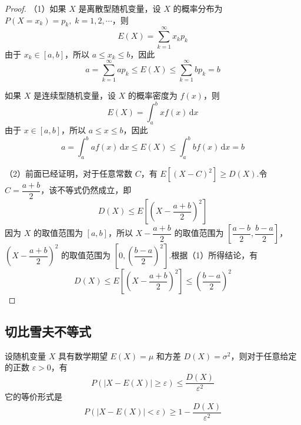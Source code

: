 \begin{proof}
    （1）如果 $X$ 是离散型随机变量，设 $X$ 的概率分布为 $P(X = x_k) = p_k, \; k=1,2,\cdots$，则
    $$
    E(X) = \sum_{k=1}^{\infty} x_k p_k
    $$
    由于 $x_k \in [a,b]$，所以 $a \leqslant x_k \leqslant b$，因此
    $$
    a = \sum_{k=1}^{\infty} a p_k \leqslant E(X) \leqslant \sum_{k=1}^{\infty} b p_k = b
    $$

    如果 $X$ 是连续型随机变量，设 $X$ 的概率密度为 $f(x)$，则
    $$
    E(X) = \int_{a}^{b} x f(x)\,\text{d}x
    $$
    由于 $x \in [a,b]$，所以 $a \leqslant x \leqslant b$，因此
    $$
    a = \int_{a}^{b} a f(x)\,\text{d}x \leqslant E(X) \leqslant \int_{a}^{b} b f(x)\,\text{d}x = b
    $$

    （2）前面已经证明，对于任意常数 $C$，有 $E[(X-C)^2] \geqslant D(X)$.令 $C = \dfrac{a+b}{2}$，该不等式仍然成立，即
    $$
    D(X) \leqslant E[(X - \dfrac{a+b}{2})^2 ]
    $$
    因为 $X$ 的取值范围为 $[a,b]$，所以 $X - \dfrac{a+b}{2}$ 的取值范围为 $\left[ \dfrac{a-b}{2}, \dfrac{b-a}{2} \right]$，$\left( X - \dfrac{a+b}{2} \right)^2$ 的取值范围为 $\left[ 0, \left( \dfrac{b-a}{2} \right)^2 \right]$.根据（1）所得结论，有
    $$
    D(X) \leqslant E[(X - \dfrac{a+b}{2})^2] \leqslant \left( \dfrac{b-a}{2} \right)^2
    $$
\end{proof}

\subsection{切比雪夫不等式}

\begin{theorem}[][切比雪夫不等式]
    \indent 设随机变量 $X$ 具有数学期望 $E(X)=\mu$ 和方差 $D(X) = \sigma^2$，则对于任意给定的正数 $\varepsilon > 0$，有
    $$
    P(|X-E(X)| \geqslant \varepsilon) \leqslant \dfrac{D(X)}{\varepsilon^2}
    $$
    它的等价形式是
    $$
    P(|X-E(X)| < \varepsilon) \geqslant 1 - \dfrac{D(X)}{\varepsilon^2}
    $$
\end{theorem}

